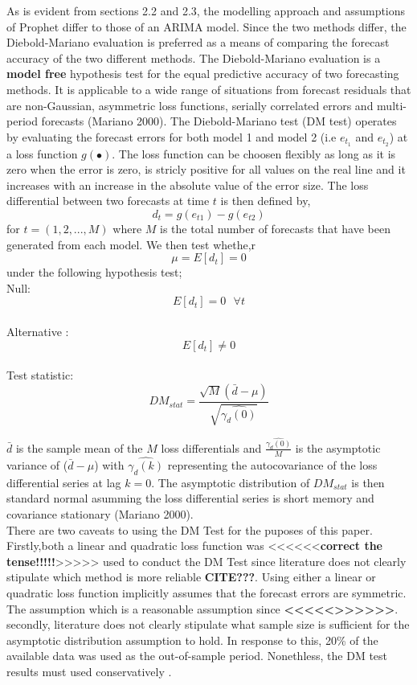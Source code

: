 \documentclass[12pt,a4paper]{article}
\numberwithin{equation}{section}
\numberwithin{figure}{section}
\numberwithin{table}{section}
\begin{document}
As is evident from sections 2.2 and 2.3, the modelling approach and
assumptions of Prophet differ to those of an ARIMA model. Since the two
methods differ, the Diebold-Mariano evaluation is preferred as a means
of comparing the forecast accuracy of the two different methods. The
Diebold-Mariano evaluation is a \textbf{model free} hypothesis test for
the equal predictive accuracy of two forecasting methods. It is
applicable to a wide range of situations from forecast residuals that
are non-Gaussian, asymmetric loss functions, serially correlated errors
and multi-period forecasts (Mariano 2000). The Diebold-Mariano test (DM
test) operates by evaluating the forecast errors for both model 1 and
model 2 (i.e \(e_{t_1}\) and \(e_{t_2}\)) at a loss function
\(g(\bullet)\). The loss function can be choosen flexibly as long as it
is zero when the error is zero, is stricly positive for all values on
the real line and it increases with an increase in the absolute value of
the error size. The loss differential between two forecasts at time
\(t\) is then defined by, \[ d_t =  g(e_{t1}) - g(e_{t2})\] for
\(t = (1, 2, ..., M)\) where \(M\) is the total number of forecasts that
have been generated from each model. We then test whethe,r
\[ \mu = E[d_t] = 0 \] under the following hypothesis test;\\
Null: \[ E[d_t] = 0  \,\,\,\, \forall t\]\\
Alternative : \[ E[d_t] \neq 0 \]\\
Test statistic:
\[DM_{stat} = \frac{\sqrt M (\bar{d} - \mu)}{\sqrt{\hat{\gamma_d(0)}}} \]

\(\bar{d}\) is the sample mean of the \(M\) loss differentials and
\(\frac{\hat{\gamma_d(0)}}{M}\) is the asymptotic variance of
(\(\bar{d} - \mu\)) with \(\hat{\gamma_d(k)}\) representing the
autocovariance of the loss differential series at lag \(k=0\). The
asymptotic distribution of \(DM_{stat}\) is then standard normal
asumming the loss differential series is short memory and covariance
stationary (Mariano 2000).\\
There are two caveats to using the DM Test for the puposes of this
paper. Firstly,both a linear and quadratic loss function was
\textless{}\textless{}\textless{}\textless{}\textless{}\textless{}\textbf{correct
the
tense!!!!!}\textgreater{}\textgreater{}\textgreater{}\textgreater{}\textgreater{}
used to conduct the DM Test since literature does not clearly stipulate
which method is more reliable \textbf{CITE???}. Using either a linear or
quadratic loss function implicitly assumes that the forecast errors are
symmetric. The assumption which is a reasonable assumption since
\textbf{\textless{}\textless{}\textless{}\textless{}\textless{}\textgreater{}\textgreater{}\textgreater{}\textgreater{}\textgreater{}\textgreater{}}.
secondly, literature does not clearly stipulate what sample size is
sufficient for the asymptotic distribution assumption to hold. In
response to this, 20\% of the available data was used as the
out-of-sample period. Nonethless, the DM test results must used
conservatively .
\end{document}
